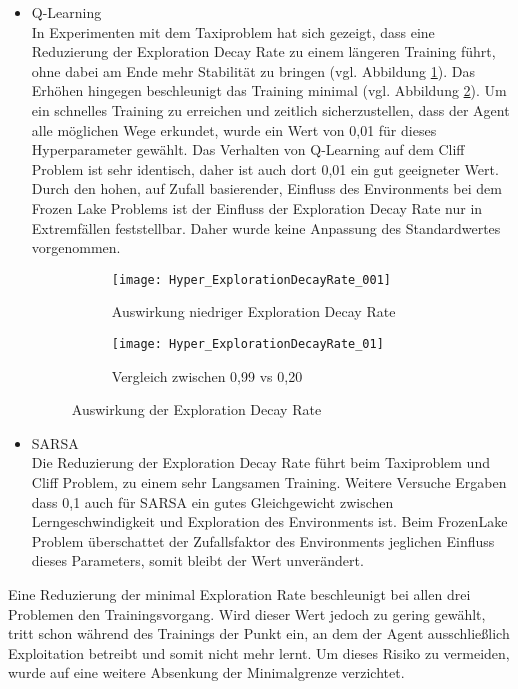\begin{itemize}
  \item Q-Learning\\
  In Experimenten mit dem Taxiproblem hat sich gezeigt, dass eine Reduzierung der Exploration Decay Rate zu einem längeren Training führt, ohne dabei am Ende mehr Stabilität zu bringen (vgl. Abbildung \ref{fig:ExplorationDecayRate_low}).
  Das Erhöhen hingegen beschleunigt das Training minimal (vgl. Abbildung \ref{fig:ExplorationDecayRate_high}).
  Um ein schnelles Training zu erreichen und zeitlich sicherzustellen, dass der Agent alle möglichen Wege erkundet, wurde ein Wert von 0,01 für dieses Hyperparameter gewählt.
  Das Verhalten von Q-Learning auf dem Cliff Problem ist sehr identisch, daher ist auch dort 0,01 ein gut geeigneter Wert.
  Durch den hohen, auf Zufall basierender, Einfluss des Environments bei dem Frozen Lake Problems ist der Einfluss der Exploration Decay Rate nur in Extremfällen feststellbar.
  Daher wurde keine Anpassung des Standardwertes vorgenommen.
  \begin{figure}[H]
    \centering
    \begin{subfigure}{.5\textwidth}
      \centering
      \texttt{[image: Hyper\_ExplorationDecayRate\_001]}
      \caption{Auswirkung niedriger Exploration Decay Rate}
      \label{fig:ExplorationDecayRate_low}
    \end{subfigure}%
    \begin{subfigure}{.5\textwidth}
      \centering
      \texttt{[image: Hyper\_ExplorationDecayRate\_01]}
      \caption{Vergleich zwischen 0,99 vs 0,20}
      \label{fig:ExplorationDecayRate_high}
    \end{subfigure}
    \caption{Auswirkung der Exploration Decay Rate}
    \label{fig:ExplorationDecayRate_Q-Learning}
  \end{figure}
  \item SARSA\\
  Die Reduzierung der Exploration Decay Rate führt beim Taxiproblem und Cliff Problem, zu einem sehr Langsamen Training.
  Weitere Versuche Ergaben dass 0,1 auch für SARSA ein gutes Gleichgewicht zwischen Lerngeschwindigkeit und Exploration des Environments ist.
  Beim FrozenLake Problem überschattet der Zufallsfaktor des Environments jeglichen Einfluss dieses Parameters, somit bleibt der Wert unverändert.

\end{itemize}
Eine Reduzierung der minimal Exploration Rate beschleunigt bei allen drei Problemen den Trainingsvorgang.
Wird dieser Wert jedoch zu gering gewählt, tritt schon während des Trainings der Punkt ein, an dem der Agent ausschließlich Exploitation betreibt und somit nicht mehr lernt.
Um dieses Risiko zu vermeiden, wurde auf eine weitere Absenkung der Minimalgrenze verzichtet.
